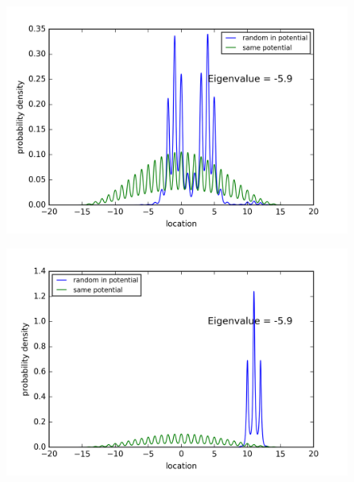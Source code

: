 \begin{figure}[!htbh]
\centering
\begin{minipage}{.45\textwidth}
  \centering
  \includegraphics[width=1.1\linewidth]{RandomPotential2/5_0a_1th_Lowest_Rand0_4_0_5.png}
  \label{fig:randPoa5_1th_0.5_0.4}
\end{minipage}\qquad
\begin{minipage}{.45\textwidth}
  \centering
  \includegraphics[width=1.1\linewidth]{RandomPotential2/5_0a_1th_Lowest_Rand0_2_0_5.png}
  \label{fig:randPoa5_1th_0.5_0.2}
\end{minipage}
\end{figure}

